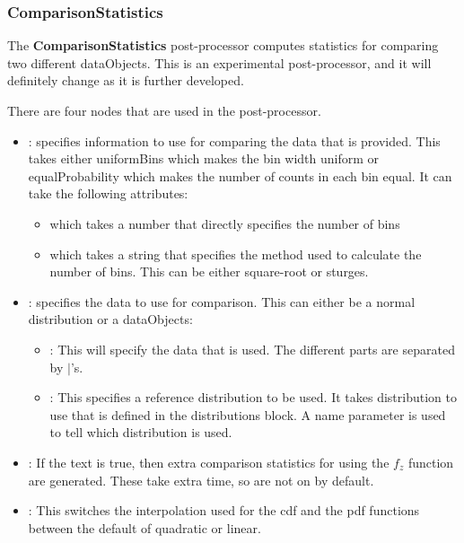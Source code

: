 \subsubsection{ComparisonStatistics}
\label{ComparisonStatistics}
The \textbf{ComparisonStatistics} post-processor computes statistics
for comparing two different dataObjects.  This is an experimental
post-processor, and it will definitely change as it is further
developed.

There are four nodes that are used in the post-processor.

\begin{itemize}
\item {}: specifies information to use for comparing the
  data that is provided.  This takes either uniformBins which makes
  the bin width uniform or equalProbability which makes the number
  of counts in each bin equal.  It can take the following attributes:
  \begin{itemize}
  \item {} which takes a number that directly
    specifies the number of bins
  \item {} which takes a string that specifies the
    method used to calculate the number of bins.  This can be either
    square-root or sturges.
  \end{itemize}
\item {}: specifies the data to use for comparison.
  This can either be a normal distribution or a dataObjects:
  \begin{itemize}
  \item {}: This will specify the data that is used.  The
    different parts are separated by $|$'s.
  \item {}: This specifies a reference distribution
    to be used.  It takes distribution to use that is defined in the
    distributions block.  A name parameter is used to tell which
    distribution is used.
  \end{itemize}
\item {}: If the text is true, then extra comparison
  statistics for using the $f_z$ function are generated.  These take
  extra time, so are not on by default.
\item {}: This switches the interpolation used
  for the cdf and the pdf functions between the default of quadratic
  or linear.
\end{itemize}

